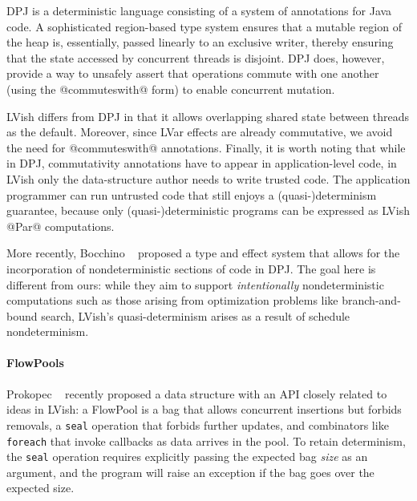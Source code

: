 DPJ \cite{dpj-oopsla, dpj-hotpar09} is a deterministic language
consisting of a system of annotations for Java code.  A sophisticated
region-based type system ensures that a mutable region of the heap is,
essentially, passed linearly to an exclusive writer, thereby ensuring
that the state accessed by concurrent threads is disjoint.  DPJ does,
however, provide a way to unsafely assert that operations commute with
one another (using the @commuteswith@ form) to enable concurrent
mutation.

LVish differs from DPJ in that it allows overlapping shared state
between threads as the default.  Moreover, since LVar effects are
already commutative, we avoid the need for @commuteswith@ annotations.
Finally, it is worth noting that while in DPJ, commutativity
annotations have to appear in application-level code, in LVish only
the data-structure author needs to write trusted code. The application
programmer can run untrusted code that still enjoys a (quasi-)determinism guarantee, because only (quasi-)deterministic programs can be expressed as LVish @Par@
computations.

More recently, Bocchino \etal~\cite{dpj-popl} proposed a type and effect system that
allows for the incorporation of nondeterministic
sections of code in DPJ.  The goal here is different from ours: while they
aim to support \emph{intentionally} nondeterministic computations such
as those arising from optimization problems like branch-and-bound
search, LVish's quasi-determinism arises as a result of schedule
nondeterminism.

\paragraph{FlowPools}

Prokopec \etal~\cite{flowpools} recently proposed a data structure with
an API closely related to ideas in LVish: a FlowPool is a bag that allows
concurrent insertions but forbids removals, a {\tt seal} operation that forbids
further updates, and combinators like {\tt foreach} that invoke callbacks as
data arrives in the pool.  To retain determinism, the {\tt seal} operation
requires explicitly passing the expected bag \emph{size} as an argument, and the
program will raise an exception if the bag goes over the expected size.

